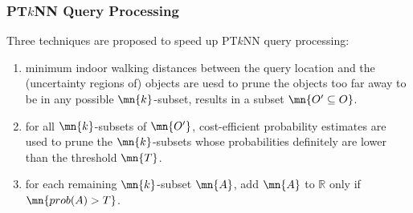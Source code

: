 \begin{frame}
\frametitle{PT$k$NN Query Processing}

\large{Three techniques are proposed to speed up PT$k$NN query processing:}
\begin{enumerate}
  \item minimum indoor walking distances between the query location and the (uncertainty regions of) objects are uesd to prune the objects too far away to be in any possible $\mn{k}$-subset, results in a subset $\mn{O' \subseteq O}$.
  \item for all $\mn{k}$-subsets of $\mn{O'}$, cost-efficient probability estimates are used to prune the $\mn{k}$-subsets whose probabilities definitely are lower than the threshold $\mn{T}$.
  \item for each remaining $\mn{k}$-subset $\mn{A}$, add $\mn{A}$ to $\mathbb{R}$ only if $\mn{prob(A) > T}$.
\end{enumerate}

\end{frame}


